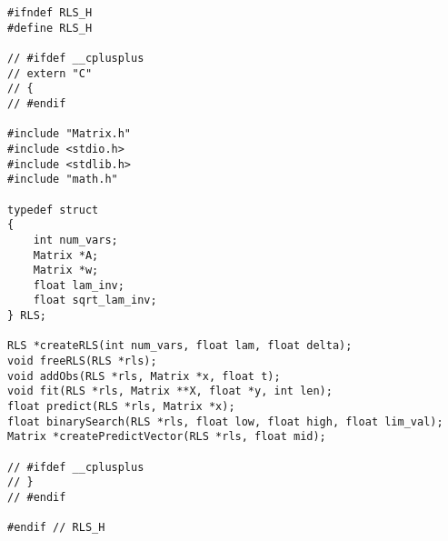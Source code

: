 \begin{lstlisting}[caption=\raggedright{mcu-libs/RLS.h}, frame=single]
#ifndef RLS_H
#define RLS_H

// #ifdef __cplusplus
// extern "C"
// {
// #endif

#include "Matrix.h"
#include <stdio.h>
#include <stdlib.h>
#include "math.h"

typedef struct
{
    int num_vars;
    Matrix *A;
    Matrix *w;
    float lam_inv;
    float sqrt_lam_inv;
} RLS;

RLS *createRLS(int num_vars, float lam, float delta);
void freeRLS(RLS *rls);
void addObs(RLS *rls, Matrix *x, float t);
void fit(RLS *rls, Matrix **X, float *y, int len);
float predict(RLS *rls, Matrix *x);
float binarySearch(RLS *rls, float low, float high, float lim_val);
Matrix *createPredictVector(RLS *rls, float mid);

// #ifdef __cplusplus
// }
// #endif

#endif // RLS_H
\end{lstlisting}
